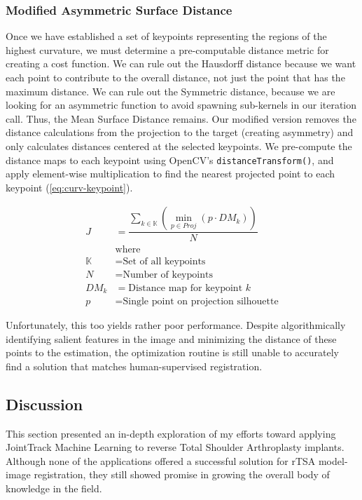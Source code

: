 \subsubsection{Modified Asymmetric Surface Distance}
Once we have established a set of keypoints representing the regions of the highest curvature, we must determine a pre-computable distance metric for creating a cost function.
We can rule out the Hausdorff distance because we want each point to contribute to the overall distance, not just the point that has the maximum distance.
We can rule out the Symmetric distance, because we are looking for an asymmetric function to avoid spawning sub-kernels in our iteration call.
Thus, the Mean Surface Distance remains.
Our modified version removes the distance calculations from the projection to the target (creating asymmetry) and only calculates distances centered at the selected keypoints.
We pre-compute the distance maps to each keypoint using OpenCV's \texttt{distanceTransform()}, and apply element-wise multiplication to find the nearest projected point to each keypoint (\cref{eq:curv-keypoint}).

\begin{equation}
  \label{eq:curv-keypoint}
  \begin{split}
    \displaystyle J &= \dfrac{\sum_{k \in \mathbb{K}}(\min_{p\in Proj}(p \cdot DM_{k}))}{N} \\
      &\text{where}\\
    \mathbb{K} &= \text{Set of all keypoints} \\
    N &= \text{Number of keypoints} \\
    DM_{k} &= \text{Distance map for keypoint $k$} \\
    p &= \text{Single point on projection silhouette}
  \end{split}
\end{equation}

Unfortunately, this too yields rather poor performance.
Despite algorithmically identifying salient features in the image and minimizing the distance of these points to the estimation, the optimization routine is still unable to accurately find a solution that matches human-supervised registration.

\subsection{Discussion}
This section presented an in-depth exploration of my efforts toward applying JointTrack Machine Learning to reverse Total Shoulder Arthroplasty implants.
Although none of the applications offered a successful solution for rTSA model-image registration, they still showed promise in growing the overall body of knowledge in the field.

